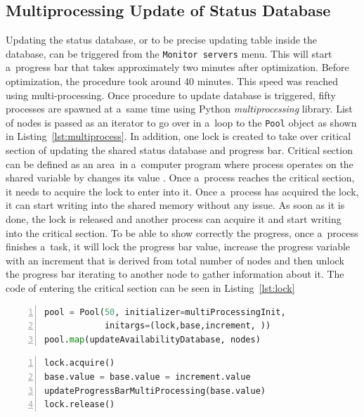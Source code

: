 {{{{\subsection{Multiprocessing Update of Status Database}
Updating the status database, or to be precise updating table inside the database, can be triggered from the \texttt{Monitor servers} menu. This will start a~progress bar that takes approximately two minutes after optimization. Before optimization, the procedure took around 40 minutes. This speed was reached using multi-processing. Once procedure to update database is triggered, fifty processes are spawned at a~same time using Python \textit{multiprocessing} library. List of nodes is passed as an iterator to go over in a~loop to the \texttt{Pool} object as shown in Listing~\ref{lst:multiprocess}. In addition, one lock is created to take over critical section of updating the shared status database and progress bar. Critical section can be defined as an area~in a~computer program where process operates on the shared variable by changes its value \cite{gebali2011algorithms}. Once a~process reaches the critical section, it needs to acquire the lock to enter into it. Once a~process has acquired the lock, it can start writing into the shared memory without any issue. As soon as it is done, the lock is released and another process can acquire it and start writing into the critical section. To be able to show correctly the progress, once a~process finishes a~task, it will lock the progress bar value, increase the progress variable with an increment that is derived from total number of nodes and then unlock the progress bar iterating to another node to gather information about it. The code of entering the critical section can be seen in  Listing~\ref{lst:lock}\\
 
{\noindent\begin{minipage}{\linewidth}
		\begin{lstlisting}[language=Python, numbers=left, label={lst:multiprocess}, caption={Creating a~multi-processing object with fifty processes, three shared variables and list of nodes as iterator.}, frame=single, showstringspaces=false, breaklines=true, keywordstyle=\color{blue},captionpos=b]
pool = Pool(50, initializer=multiProcessingInit,
		  	initargs=(lock,base,increment, ))
pool.map(updateAvailabilityDatabase, nodes)
		\end{lstlisting}
	\end{minipage} 

{\noindent\begin{minipage}{\linewidth}
		\begin{lstlisting}[language=Python, numbers=left, label={lst:lock}, caption=Entering a~critical section and acquiring lock., frame=single, showstringspaces=false, breaklines=true, keywordstyle=\color{blue},captionpos=b]
lock.acquire()
base.value = base.value = increment.value
updateProgressBarMultiProcessing(base.value)
lock.release()
		\end{lstlisting}
	\end{minipage} 

}}}}}}
